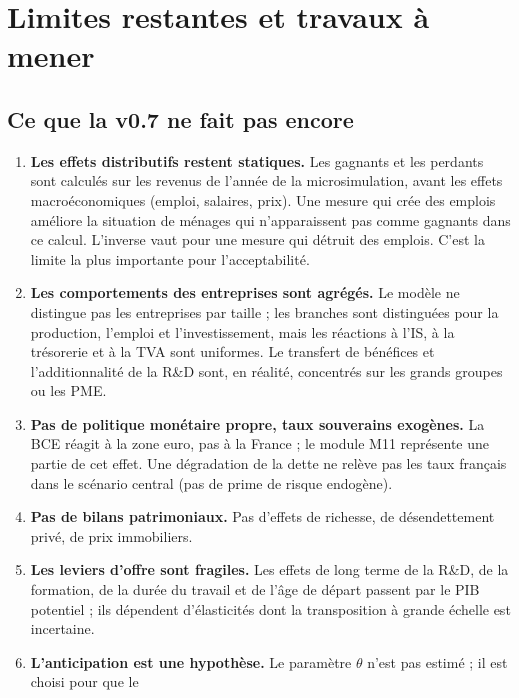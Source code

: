 \chapter{Limites restantes et travaux à mener}\label{ch:limites}

\section{Ce que la v0.7 ne fait pas encore}

\begin{enumerate}
\item \textbf{Les effets distributifs restent statiques.} Les gagnants et les perdants sont calculés sur les revenus
de l'année de la microsimulation, avant les effets macroéconomiques (emploi, salaires, prix). Une mesure qui crée des
emplois améliore la situation de ménages qui n'apparaissent pas comme gagnants dans ce calcul. L'inverse vaut pour une
mesure qui détruit des emplois. C'est la limite la plus importante pour l'acceptabilité.
\item \textbf{Les comportements des entreprises sont agrégés.} Le modèle ne distingue pas les entreprises par taille ;
les branches sont distinguées pour la production, l'emploi et l'investissement, mais les réactions à l'IS, à la
trésorerie et à la TVA sont uniformes. Le transfert de bénéfices et l'additionnalité de la R\&D sont, en réalité,
concentrés sur les grands groupes ou les PME.
\item \textbf{Pas de politique monétaire propre, taux souverains exogènes.} La BCE réagit à la zone euro, pas à la
France ; le module M11 représente une partie de cet effet. Une dégradation de la dette ne relève pas les taux
français dans le scénario central (pas de prime de risque endogène).
\item \textbf{Pas de bilans patrimoniaux.} Pas d'effets de richesse, de désendettement privé, de prix immobiliers.
\item \textbf{Les leviers d'offre sont fragiles.} Les effets de long terme de la R\&D, de la formation, de la durée du
travail et de l'âge de départ passent par le PIB potentiel ; ils dépendent d'élasticités dont la transposition à
grande échelle est incertaine.
\item \textbf{L'anticipation est une hypothèse.} Le paramètre $\theta$ n'est pas estimé ; il est choisi pour que le

\end{enumerate}
